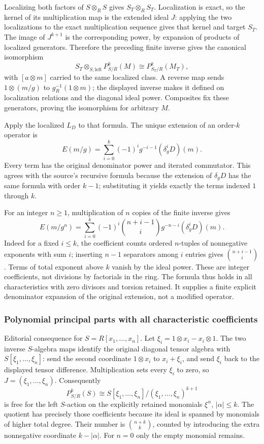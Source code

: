 Localizing both factors of \(S\otimes_RS\) gives \(S_T\otimes_RS_T\). Localization is exact, so the kernel of its multiplication map is the extended ideal \(J\): applying the two localizations to the exact multiplication sequence gives that kernel and target \(S_T\). The image of \(J^{k+1}\) is the corresponding power, by expansion of products of localized generators. Therefore the preceding finite inverse gives the canonical isomorphism \[
S_T\otimes_{S,\mathrm{left}}P^k_{S/R}(M)
\cong P^k_{S_T/R}(M_T),
\] with \([a\otimes m]\) carried to the same localized class. A reverse map sends \(1\otimes(m/g)\) to \(g_R^{-1}(1\otimes m)\); the displayed inverse makes it defined on localization relations and the diagonal ideal power. Composites fix these generators, proving the isomorphism for arbitrary \(M\).

Apply the localized \(L_D\) to that formula. The unique extension of an order-\(k\) operator is \[
E(m/g)=\sum_{i=0}^k(-1)^i g^{-i-1}(\delta_g^iD)(m).
\] Every term has the original denominator power and iterated commutator. This agrees with the source's recursive formula because the extension of \(\delta_gD\) has the same formula with order \(k-1\); substituting it yields exactly the terms indexed \(1\) through \(k\).

For an integer \(n\ge1\), multiplication of \(n\) copies of the finite inverse gives \[
E(m/g^n)=\sum_{i=0}^k(-1)^i\binom{n+i-1}{i}g^{-n-i}(\delta_g^iD)(m).
\] Indeed for a fixed \(i\le k\), the coefficient counts ordered \(n\)-tuples of nonnegative exponents with sum \(i\); inserting \(n-1\) separators among \(i\) entries gives \(\binom{n+i-1}{i}\). Terms of total exponent above \(k\) vanish by the ideal power. These are integer coefficients, not divisions by factorials in the ring. The formula thus holds in all characteristics with zero divisors and torsion retained. It supplies a finite explicit denominator expansion of the original extension, not a modified operator.

\subsubsection{Polynomial principal parts with all characteristic coefficients}\label{algebra-proof-043-polynomial-principal-parts-with-all-characteristic-coefficients}

Editorial consequence for \(S=R[x_1,\ldots,x_n]\). Let \(\xi_i=1\otimes x_i-x_i\otimes1\). The two inverse \(S\)-algebra maps identify the original diagonal tensor algebra with \(S[\xi_1,\ldots,\xi_n]\): send the second coordinate \(1\otimes x_i\) to \(x_i+\xi_i\), and send \(\xi_i\) back to the displayed tensor difference. Multiplication sets every \(\xi_i\) to zero, so \(J=(\xi_1,\ldots,\xi_n)\). Consequently \[
P^k_{S/R}(S)\cong S[\xi_1,\ldots,\xi_n]/(\xi_1,\ldots,\xi_n)^{k+1}
\] is free for the left \(S\)-action on the explicitly retained monomials \(\xi^\alpha\), \(|\alpha|\le k\). The quotient has precisely those coefficients because its ideal is spanned by monomials of higher total degree. Their number is \(\binom{n+k}{k}\), counted by introducing the extra nonnegative coordinate \(k-|\alpha|\). For \(n=0\) only the empty monomial remains.


